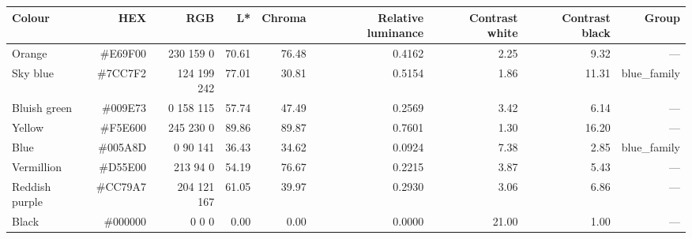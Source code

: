 \begin{tabular}{lrrrrrrrr}
\toprule
Colour & HEX & RGB & L* & Chroma & Relative luminance & Contrast white & Contrast black & Group \\
\midrule
Orange & \#E69F00 & 230 159 0 & 70.61 & 76.48 & 0.4162 & 2.25 & 9.32 & — \\
Sky blue & \#7CC7F2 & 124 199 242 & 77.01 & 30.81 & 0.5154 & 1.86 & 11.31 & blue\_family \\
Bluish green & \#009E73 & 0 158 115 & 57.74 & 47.49 & 0.2569 & 3.42 & 6.14 & — \\
Yellow & \#F5E600 & 245 230 0 & 89.86 & 89.87 & 0.7601 & 1.30 & 16.20 & — \\
Blue & \#005A8D & 0 90 141 & 36.43 & 34.62 & 0.0924 & 7.38 & 2.85 & blue\_family \\
Vermillion & \#D55E00 & 213 94 0 & 54.19 & 76.67 & 0.2215 & 3.87 & 5.43 & — \\
Reddish purple & \#CC79A7 & 204 121 167 & 61.05 & 39.97 & 0.2930 & 3.06 & 6.86 & — \\
Black & \#000000 & 0 0 0 & 0.00 & 0.00 & 0.0000 & 21.00 & 1.00 & — \\
\bottomrule
\end{tabular}
